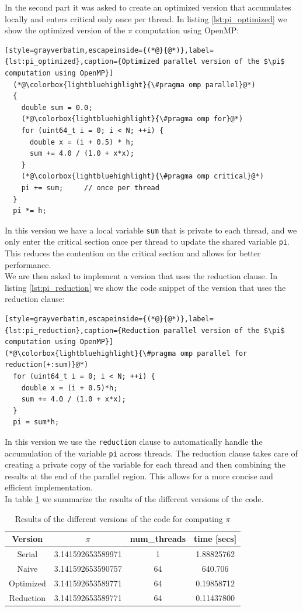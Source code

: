 \documentclass[unicode,10pt,a4paper,oneside,numbers=endperiod,openany]{scrartcl}
\begin{document}
In the second part it was asked to create an optimized version that accumulates locally and enters critical only once per thread. In listing \ref{lst:pi_optimized} we show the optimized version of the $\pi$ computation using OpenMP:
\begin{lstlisting}[style=grayverbatim,escapeinside={(*@}{@*)},label={lst:pi_optimized},caption={Optimized parallel version of the $\pi$ computation using OpenMP}]
  (*@\colorbox{lightbluehighlight}{\#pragma omp parallel}@*)
  {
    double sum = 0.0;
    (*@\colorbox{lightbluehighlight}{\#pragma omp for}@*)
    for (uint64_t i = 0; i < N; ++i) {
      double x = (i + 0.5) * h;
      sum += 4.0 / (1.0 + x*x);
    }
    (*@\colorbox{lightbluehighlight}{\#pragma omp critical}@*)
    pi += sum;     // once per thread
  }
  pi *= h;
\end{lstlisting}
In this version we have a local variable \texttt{sum} that is private to each thread, and we only enter the critical section once per thread to update the shared variable \texttt{pi}. This reduces the contention on the critical section and allows for better performance.\\

We are then asked to implement a version that uses the reduction clause. In listing \ref{lst:pi_reduction} we show the code snippet of the version that uses the reduction clause:
\begin{lstlisting}[style=grayverbatim,escapeinside={(*@}{@*)},label={lst:pi_reduction},caption={Reduction parallel version of the $\pi$ computation using OpenMP}]
(*@\colorbox{lightbluehighlight}{\#pragma omp parallel for reduction(+:sum)}@*)
  for (uint64_t i = 0; i < N; ++i) {
    double x = (i + 0.5)*h;
    sum += 4.0 / (1.0 + x*x);
  }
  pi = sum*h;
\end{lstlisting}
In this version we use the \texttt{reduction} clause to automatically handle the accumulation of the variable \texttt{pi} across threads. The reduction clause takes care of creating a private copy of the variable for each thread and then combining the results at the end of the parallel region. This allows for a more concise and efficient implementation.\\
In table \ref{tab:pi_results} we summarize the results of the different versions of the code.
\begin{table}[h]
\centering
\begin{tabular}{|c|c|c|c|}
\hline
Version & $\pi$ & num\_threads & time [secs] \\
\hline
Serial & 3.141592653589971 & 1 & 1.88825762 \\
Naive & 3.141592653590757 & 64 & 640.706\\
Optimized & 3.141592653589771 & 64 & 0.19858712 \\
Reduction & 3.141592653589771 & 64 & 0.11437800 \\
\hline
\end{tabular}
\caption{Results of the different versions of the code for computing $\pi$}
\label{tab:pi_results}
\end{table}
\end{document}

